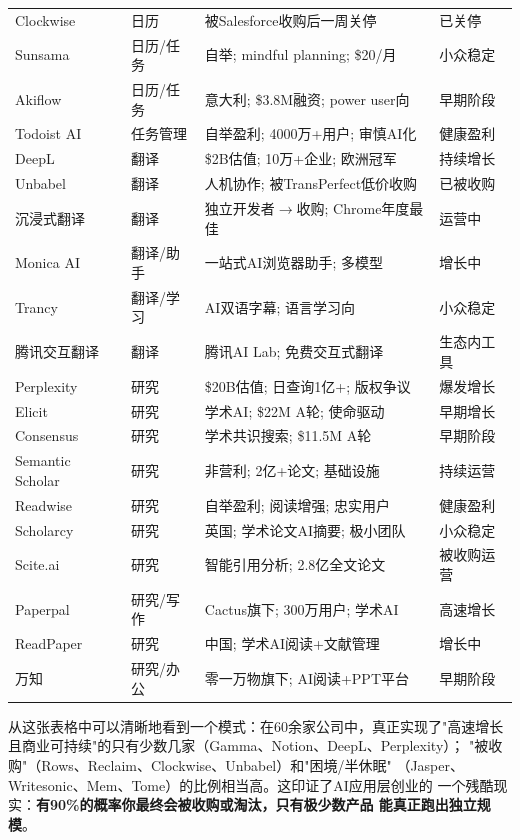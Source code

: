 \begin{keybox}[本章60+家公司状态速查表（截至2026年3月）]
\begin{tabularx}{\textwidth}{l l X l}
Clockwise      & 日历 & 被Salesforce收购后一周关停 & 已关停 \\
Sunsama        & 日历/任务 & 自举; mindful planning; \$20/月 & 小众稳定 \\
Akiflow        & 日历/任务 & 意大利; \$3.8M融资; power user向 & 早期阶段 \\
Todoist AI     & 任务管理 & 自举盈利; 4000万+用户; 审慎AI化 & 健康盈利 \\
\midrule
DeepL          & 翻译 & \$2B估值; 10万+企业; 欧洲冠军 & 持续增长 \\
Unbabel        & 翻译 & 人机协作; 被TransPerfect低价收购 & 已被收购 \\
沉浸式翻译      & 翻译 & 独立开发者$\to$收购; Chrome年度最佳 & 运营中 \\
Monica AI      & 翻译/助手 & 一站式AI浏览器助手; 多模型 & 增长中 \\
Trancy         & 翻译/学习 & AI双语字幕; 语言学习向 & 小众稳定 \\
腾讯交互翻译    & 翻译 & 腾讯AI Lab; 免费交互式翻译 & 生态内工具 \\
\midrule
Perplexity     & 研究 & \$20B估值; 日查询1亿+; 版权争议 & 爆发增长 \\
Elicit         & 研究 & 学术AI; \$22M A轮; 使命驱动 & 早期增长 \\
Consensus      & 研究 & 学术共识搜索; \$11.5M A轮 & 早期阶段 \\
Semantic Scholar & 研究 & 非营利; 2亿+论文; 基础设施 & 持续运营 \\
Readwise       & 研究 & 自举盈利; 阅读增强; 忠实用户 & 健康盈利 \\
Scholarcy      & 研究 & 英国; 学术论文AI摘要; 极小团队 & 小众稳定 \\
Scite.ai       & 研究 & 智能引用分析; 2.8亿全文论文 & 被收购运营 \\
Paperpal       & 研究/写作 & Cactus旗下; 300万用户; 学术AI & 高速增长 \\
ReadPaper      & 研究 & 中国; 学术AI阅读+文献管理 & 增长中 \\
万知           & 研究/办公 & 零一万物旗下; AI阅读+PPT平台 & 早期阶段 \\
\bottomrule
\end{tabularx}
\end{keybox}

从这张表格中可以清晰地看到一个模式：在60余家公司中，真正实现了"高速增长
且商业可持续"的只有少数几家（Gamma、Notion、DeepL、Perplexity）；
"被收购"（Rows、Reclaim、Clockwise、Unbabel）和"困境/半休眠"
（Jasper、Writesonic、Mem、Tome）的比例相当高。这印证了AI应用层创业的
一个残酷现实：\textbf{有90\%的概率你最终会被收购或淘汰，只有极少数产品
能真正跑出独立规模}。

